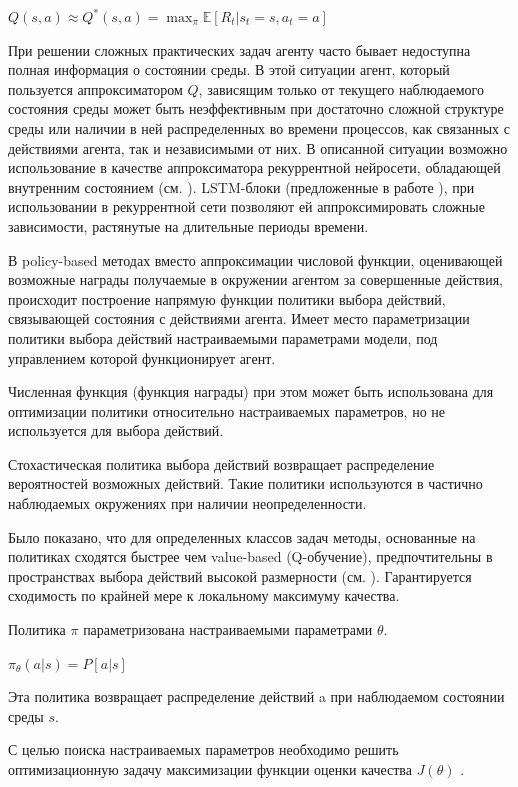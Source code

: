 $Q(s,a)\approx Q^{*}(s,a)=\max_{\pi}\mathbb{E}\left [ R_t|s_t=s,a_t=a \right ]$

При решении сложных практических задач агенту часто бывает недоступна полная информация о состоянии среды. В этой ситуации агент, который пользуется аппроксиматором $Q$, зависящим только от текущего наблюдаемого состояния среды может быть неэффективным при достаточно сложной структуре среды или наличии в ней распределенных во времени процессов, как связанных с действиями агента, так и независимыми от них. В описанной ситуации возможно использование в качестве аппроксиматора рекуррентной нейросети, обладающей внутренним состоянием (см. ). LSTM-блоки (предложенные в работе ), при использовании в рекуррентной сети позволяют ей аппроксимировать сложные зависимости, растянутые на длительные периоды времени.


В policy-based методах вместо аппроксимации числовой функции, оценивающей возможные награды получаемые в окружении агентом за совершенные действия, происходит построение напрямую функции политики выбора действий, связывающей состояния с действиями агента. Имеет место параметризации политики выбора действий настраиваемыми параметрами модели, под управлением которой функционирует агент.

Численная функция (функция награды) при этом может быть использована для оптимизации политики относительно настраиваемых параметров, но не используется для выбора действий.

Стохастическая политика выбора действий возвращает распределение вероятностей возможных действий. Такие политики используются в частично наблюдаемых окружениях при наличии неопределенности.


Было показано, что для определенных классов задач методы, основанные на политиках сходятся быстрее чем value-based (Q-обучение), предпочтительны в пространствах выбора действий высокой размерности (см. ). Гарантируется сходимость по крайней мере к локальному максимуму качества.


Политика $\pi$ параметризована настраиваемыми параметрами $\theta$.

$\pi_{\theta} (a|s)= P[a|s]$

Эта политика возвращает распределение действий a при наблюдаемом состоянии среды $s$.

С целью поиска настраиваемых параметров необходимо решить оптимизационную задачу максимизации функции оценки качества $J( \theta )$ .

